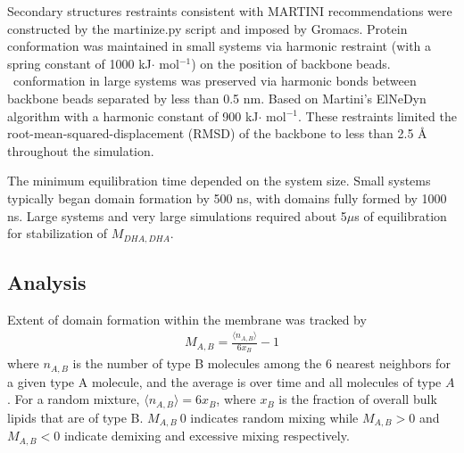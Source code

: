 Secondary structures restraints consistent with MARTINI recommendations were constructed by the martinize.py \cite{martini} script {and} imposed by Gromacs\cite{grom}. Protein conformation was maintained in small systems via harmonic restraint (with a spring constant of 1000 kJ$\cdot$ mol$^{-1}$) on the position of backbone beads. \nachr~conformation in large systems was preserved via harmonic bonds between backbone beads separated by less than 0.5 nm. Based on Martini's \cite{martini} ElNeDyn algorithm \cite{Periole_Combining_2009} with a harmonic constant of 900 kJ$\cdot$ mol$^{-1}$.  These restraints limited the root-mean-squared-displacement (RMSD) of the backbone to less than 2.5 \r{A} throughout the simulation.  

The minimum equilibration time depended on the system size. Small systems typically began domain formation by 500 ns, with domains fully formed by 1000 ns. Large systems and very large simulations required about 5$\mu$s of equilibration for stabilization of $M_{DHA,DHA}$.

\subsection{Analysis}

Extent of domain formation within the membrane was tracked by 
    \begin{equation}
    \begin{aligned}
      M_{A, B} = \frac{\langle n_{A,B} \rangle} {6x_{B}} -1 
    \end{aligned}
    \label{eq:M}
  \end{equation}
 where $n_{A,B}$ is the number of type B molecules among the 6 nearest neighbors for a given type A molecule, and the average is over time and all molecules of type $A$. For a random mixture, $\langle n_{A,B} \rangle = 6x_{B}$, where $x_{B}$ is the fraction of overall bulk lipids that are of type B. ${M_{A,B}~0}$ indicates random mixing while ${M_{A,B}>0}$  and ${M_{A,B}<0}$ indicate demixing and excessive mixing respectively.  


